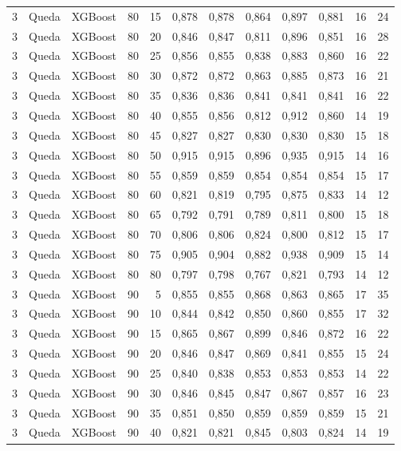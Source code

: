 \begin{longtable}{ccclrrrrrrrr}
3 & Queda & XGBoost & 80 & 15 & 0,878 & 0,878 & 0,864 & 0,897 & 0,881 & 16 & 24 \\
3 & Queda & XGBoost & 80 & 20 & 0,846 & 0,847 & 0,811 & 0,896 & 0,851 & 16 & 28 \\
3 & Queda & XGBoost & 80 & 25 & 0,856 & 0,855 & 0,838 & 0,883 & 0,860 & 16 & 22 \\
3 & Queda & XGBoost & 80 & 30 & 0,872 & 0,872 & 0,863 & 0,885 & 0,873 & 16 & 21 \\
3 & Queda & XGBoost & 80 & 35 & 0,836 & 0,836 & 0,841 & 0,841 & 0,841 & 16 & 22 \\
3 & Queda & XGBoost & 80 & 40 & 0,855 & 0,856 & 0,812 & 0,912 & 0,860 & 14 & 19 \\
3 & Queda & XGBoost & 80 & 45 & 0,827 & 0,827 & 0,830 & 0,830 & 0,830 & 15 & 18 \\
3 & Queda & XGBoost & 80 & 50 & 0,915 & 0,915 & 0,896 & 0,935 & 0,915 & 14 & 16 \\
3 & Queda & XGBoost & 80 & 55 & 0,859 & 0,859 & 0,854 & 0,854 & 0,854 & 15 & 17 \\
3 & Queda & XGBoost & 80 & 60 & 0,821 & 0,819 & 0,795 & 0,875 & 0,833 & 14 & 12 \\
3 & Queda & XGBoost & 80 & 65 & 0,792 & 0,791 & 0,789 & 0,811 & 0,800 & 15 & 18 \\
3 & Queda & XGBoost & 80 & 70 & 0,806 & 0,806 & 0,824 & 0,800 & 0,812 & 15 & 17 \\
3 & Queda & XGBoost & 80 & 75 & 0,905 & 0,904 & 0,882 & 0,938 & 0,909 & 15 & 14 \\
3 & Queda & XGBoost & 80 & 80 & 0,797 & 0,798 & 0,767 & 0,821 & 0,793 & 14 & 12 \\
3 & Queda & XGBoost & 90 & 5 & 0,855 & 0,855 & 0,868 & 0,863 & 0,865 & 17 & 35 \\
3 & Queda & XGBoost & 90 & 10 & 0,844 & 0,842 & 0,850 & 0,860 & 0,855 & 17 & 32 \\
3 & Queda & XGBoost & 90 & 15 & 0,865 & 0,867 & 0,899 & 0,846 & 0,872 & 16 & 22 \\
3 & Queda & XGBoost & 90 & 20 & 0,846 & 0,847 & 0,869 & 0,841 & 0,855 & 15 & 24 \\
3 & Queda & XGBoost & 90 & 25 & 0,840 & 0,838 & 0,853 & 0,853 & 0,853 & 14 & 22 \\
3 & Queda & XGBoost & 90 & 30 & 0,846 & 0,845 & 0,847 & 0,867 & 0,857 & 16 & 23 \\
3 & Queda & XGBoost & 90 & 35 & 0,851 & 0,850 & 0,859 & 0,859 & 0,859 & 15 & 21 \\
3 & Queda & XGBoost & 90 & 40 & 0,821 & 0,821 & 0,845 & 0,803 & 0,824 & 14 & 19 \\

\end{longtable}
